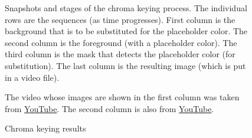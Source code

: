 \begin{figure}[t]
    \caption{Chroma keying results}
    \label{fig:q2-chroma-keying}
    \small
        Snapshots and stages of the chroma keying process. The individual rows are the sequences (as time progresses). First column is the background that is to be substituted for the placeholder color. The second column is the foreground (with a placeholder color). The third column is the mask that detects the placeholder color (for substitution). The last column is the resulting image (which is put in a video file).

        The video whose images are shown in the first column was taken from \href{https://youtu.be/MPUBSZYESgU}{YouTube}. The second column is also from \href{https://youtu.be/cqZuhJZAK-8}{YouTube}.
\end{figure}
